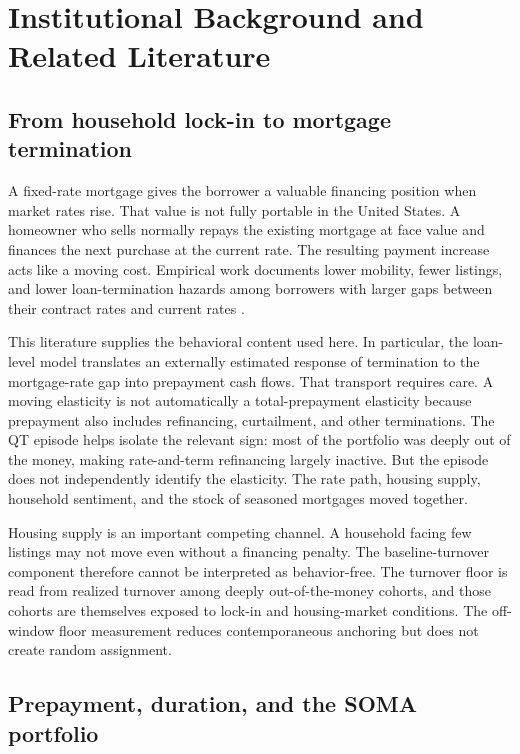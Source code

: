 \section{Institutional Background and Related Literature}\label{sec:setting}\label{sec:lit}

\subsection{From household lock-in to mortgage termination}

A fixed-rate mortgage gives the borrower a valuable financing position when market rates rise. That value is not fully portable in the United States. A homeowner who sells normally repays the existing mortgage at face value and finances the next purchase at the current rate. The resulting payment increase acts like a moving cost. Empirical work documents lower mobility, fewer listings, and lower loan-termination hazards among borrowers with larger gaps between their contract rates and current rates \citep{berger2021,eichenbaum2022,liebersohn2024,batzer2024,fonseca2024}.

This literature supplies the behavioral content used here. In particular, the loan-level model translates an externally estimated response of termination to the mortgage-rate gap into prepayment cash flows. That transport requires care. A moving elasticity is not automatically a total-prepayment elasticity because prepayment also includes refinancing, curtailment, and other terminations. The QT episode helps isolate the relevant sign: most of the portfolio was deeply out of the money, making rate-and-term refinancing largely inactive. But the episode does not independently identify the elasticity. The rate path, housing supply, household sentiment, and the stock of seasoned mortgages moved together.

Housing supply is an important competing channel. A household facing few listings may not move even without a financing penalty. The baseline-turnover component therefore cannot be interpreted as behavior-free. The turnover floor is read from realized turnover among deeply out-of-the-money cohorts, and those cohorts are themselves exposed to lock-in and housing-market conditions. The off-window floor measurement reduces contemporaneous anchoring but does not create random assignment.

\subsection{Prepayment, duration, and the SOMA portfolio}

